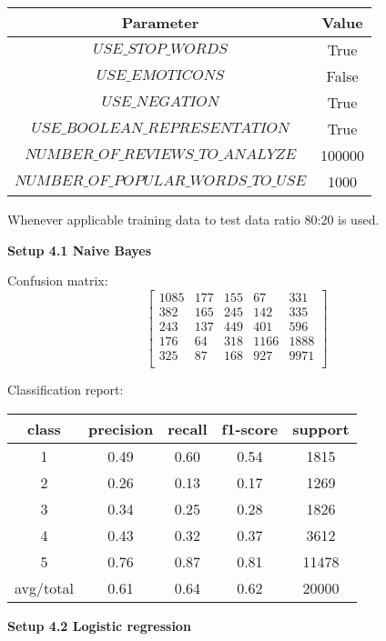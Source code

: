 \documentclass[12pt]{report}
\begin{document}
\begin{center}
	\begin{tabular}{ c | c }
		\hline
		Parameter & Value \\ \hline
		$USE\_STOP\_WORDS$ & True \\ \hline
		$USE\_EMOTICONS$ & False \\ \hline
		$USE\_NEGATION$ & True \\ \hline
		$USE\_BOOLEAN\_REPRESENTATION$ & True \\ \hline
		$NUMBER\_OF\_REVIEWS\_TO\_ANALYZE$ & 100000 \\ \hline
		$NUMBER\_OF\_POPULAR\_WORDS\_TO\_USE$ & 1000 \\ \hline
	\end{tabular}
\end{center}

Whenever applicable training data to test data ratio 80:20 is used.

\bigbreak

\textbf{Setup 4.1 Naive Bayes}

Confusion matrix:
\[
\begin{bmatrix}
1085 & 177 & 155 & 67 & 331 \\
382 & 165 & 245 & 142 & 335 \\
243 & 137 & 449 & 401 & 596 \\
176 & 64 & 318 & 1166 & 1888 \\
325 &  87 & 168 & 927 & 9971 \\
\end{bmatrix}
\]

Classification report:

\begin{center}
	\begin{tabular}{c | c | c | c | c }
		\hline
		class & precision & recall & f1-score & support \\ \hline
		1 & 0.49 & 0.60 & 0.54 & 1815 \\ \hline
		2 & 0.26 & 0.13 & 0.17 & 1269 \\ \hline
		3 & 0.34 & 0.25 & 0.28 & 1826 \\ \hline
		4 & 0.43 & 0.32 & 0.37 & 3612 \\ \hline
		5 & 0.76 & 0.87 & 0.81 & 11478 \\ \hline
		avg/total & 0.61 & 0.64 & 0.62 & 20000 \\ \hline
	\end{tabular}
\end{center}

\textbf{Setup 4.2 Logistic regression}
\end{document}
